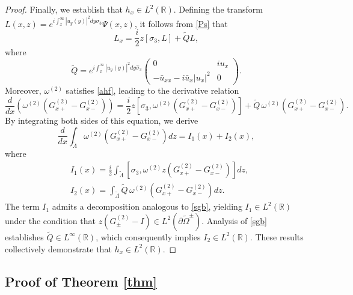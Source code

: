 \documentclass[preprint,compress,12pt]{elsarticle}
\numberwithin{equation}{section}
\begin{document}
\begin{proof}
Finally, we establish that $h_{x}\in L^{2}(\mathbb{R})$. Defining the transform $L(x,z)=e^{i\int_{x}^{\infty}|u_{y}(y)|^{2}dy\sigma_{3}}\Psi(x,z)$, it follows from \eqref{Ps} that
\begin{equation}\label{ahf}
L_{x}=\frac{i}{2}z\left[\sigma_{3},L\right]+\widetilde{Q}L,
\end{equation}
where
\begin{equation*}
\widetilde{Q}=e^{i\int_{x}^{\infty}|u_{y}(y)|^{2}dy\widehat{\sigma}_{3}}\begin{pmatrix}0&iu_{x}\\
-\bar{u}_{xx}-i\bar{u}_{x}|u_{x}|^{2}&0\end{pmatrix}.
\end{equation*}
Moreover, $\omega^{(2)}$ satisfies \eqref{ahf}, leading to the derivative relation
\begin{equation*}
\frac{d}{dx}\left(\omega^{(2)} \left(G^{(2)}_{x+}-G^{(2)}_{x-}\right)\right)=\frac{i}{2}z\left[\sigma_{3},\omega^{(2)} \left(G^{(2)}_{x+}-G^{(2)}_{x-}\right)\right]+\widetilde{Q}\,\omega^{(2)} \left(G^{(2)}_{x+}-G^{(2)}_{x-}\right).
\end{equation*}
By integrating both sides of this equation, we derive
\begin{equation}
\frac{d}{dx}\int_{\widetilde{\Lambda}}\omega^{(2)} \left(G^{(2)}_{x+}-G^{(2)}_{x-}\right)dz=I_{1}(x)+I_{2}(x),
\end{equation}
where
\begin{equation*}
\begin{aligned}
&I_{1}(x)=\frac{i}{2}\int_{\widetilde{\Lambda}}\left[\sigma_{3},\omega^{(2)} z\left(G^{(2)}_{x+}-G^{(2)}_{x-}\right)\right]dz,\\
&I_{2}(x)=\int_{\widetilde{\Lambda}}\widetilde{Q}\,\omega^{(2)} \left(G^{(2)}_{x+}-G^{(2)}_{x-}\right)dz.
\end{aligned}
\end{equation*}
The term $I_{1}$ admits a decomposition analogous to \eqref{sgb}, yielding $I_{1}\in L^{2}(\mathbb{R})$  under the condition that $z(G^{(2)}_{\pm}-I)\in L^{2}(\partial \widetilde{\Omega}^{\pm})$. Analysis of \eqref{sgb} establishes $\widetilde{Q}\in L^{\infty}(\mathbb{R})$, which consequently implies $I_{2}\in L^{2}(\mathbb{R})$. These results collectively demonstrate that $h_{x}\in L^{2}(\mathbb{R})$.
\end{proof}


\subsection{Proof of Theorem \ref{thm}}\label{sub43}
\end{document}
